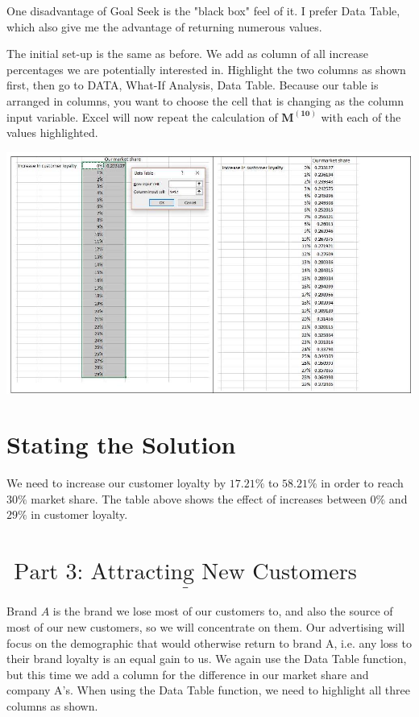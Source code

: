 \documentclass[10pt]{article}
\begin{document}
One disadvantage of Goal Seek is the "black box" feel of it. I prefer Data Table, which also give me the advantage of returning numerous values.

The initial set-up is the same as before. We add as column of all increase percentages we are potentially interested in. Highlight the two columns as shown first, then go to DATA, What-If Analysis, Data Table. Because our table is arranged in columns, you want to choose the cell that is changing as the column input variable. Excel will now repeat the calculation of $\mathbf{M}^{(\mathbf{1 0})}$ with each of the values highlighted.

\includegraphics[max width=\textwidth]{2022_07_05_5945264bba2a5f6ba667g-78}

\section{Stating the Solution}
We need to increase our customer loyalty by $17.21 \%$ to $58.21 \%$ in order to reach $30 \%$ market share. The table above shows the effect of increases between $0 \%$ and $29 \%$ in customer loyalty.

\section{$\underline{\text { Part 3: Attracting New Customers }}$}
Brand $A$ is the brand we lose most of our customers to, and also the source of most of our new customers, so we will concentrate on them. Our advertising will focus on the demographic that would otherwise return to brand A, i.e. any loss to their brand loyalty is an equal gain to us. We again use the Data Table function, but this time we add a column for the difference in our market share and company A's. When using the Data Table function, we need to highlight all three columns as shown.
\end{document}
